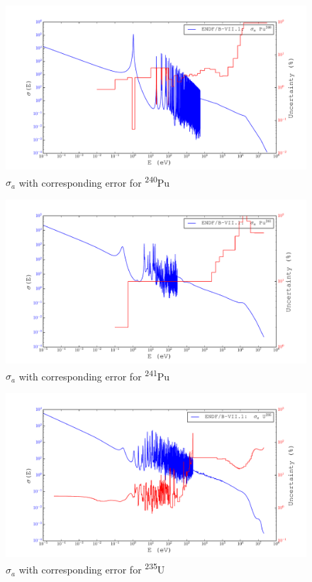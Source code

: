 \documentclass[11pt,notitlepage]{article}
\newcommand{\tss}{\textsuperscript}
\begin{document}
\begin{todolist}
    \begin{figure}[H]
    \begin{center}
      \includegraphics[width=0.77\columnwidth]{../Weighting/X_Sections/XwVar_Pu_240_94_a.pdf}
      \vspace{-5mm}
      \caption{$\sigma_a$ with corresponding error for \tss{240}Pu}
      \label{fig:XPu240}
    \end{center}
  \end{figure}

    \begin{figure}[H]
    \begin{center}
      \includegraphics[width=0.77\columnwidth]{../Weighting/X_Sections/XwVar_Pu_241_94_a.pdf}
      \vspace{-5mm}
      \caption{$\sigma_a$ with corresponding error for \tss{241}Pu}
      \label{fig:XPu241}
    \end{center}
  \end{figure}

  \begin{figure}[H]
    \begin{center}
      \includegraphics[width=0.77\columnwidth]{../Weighting/X_Sections/XwVar_U_235_92_a.pdf}
      \vspace{-5mm}
      \caption{$\sigma_a$ with corresponding error for \tss{235}U}
      \label{fig:XU235}
    \end{center}
  \end{figure}


\end{todolist}
\end{document}
